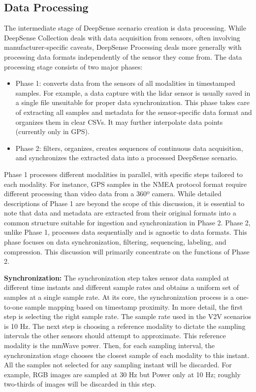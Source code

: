 \documentclass[10pt,comsoc]{IEEEtran}
\begin{document}
\subsection{Data Processing} \label{subsec:Processing}

The intermediate stage of DeepSense scenario creation is data processing. While DeepSense Collection deals with data acquisition from sensors, often involving manufacturer-specific caveats, DeepSense Processing deals more generally with processing data formats independently of the sensor they come from. The data processing stage consists of two major phases:
\begin{itemize}
    \item Phase 1: converts data from the sensors of all modalities in timestamped samples. For example, a data capture with the lidar sensor is usually saved in a single file unsuitable for proper data synchronization. This phase takes care of extracting all samples and metadata for the sensor-specific data format and organizes them in clear CSVs. It may further interpolate data points (currently only in GPS).
    \item Phase 2: filters, organizes, creates sequences of continuous data acquisition, and synchronizes the extracted data into a processed DeepSense scenario.
\end{itemize}
Phase 1 processes different modalities in parallel, with specific steps tailored to each modality. For instance, GPS samples in the NMEA protocol format require different processing than video data from a 360º camera. While detailed descriptions of Phase 1 are beyond the scope of this discussion, it is essential to note that data and metadata are extracted from their original formats into a common structure suitable for ingestion and synchronization in Phase 2. Phase 2, unlike Phase 1, processes data sequentially and is agnostic to data formats. This phase focuses on data synchronization, filtering, sequencing, labeling, and compression. This discussion will primarily concentrate on the functions of Phase 2.

\textbf{Synchronization:} The synchronization step takes sensor data sampled at different time instants and different sample rates and obtains a uniform set of samples at a single sample rate. At its core, the synchronization process is a one-to-one sample mapping based on timestamp proximity. In more detail, the first step is selecting the right sample rate. The sample rate used in the V2V scenarios is 10 Hz. The next step is choosing a reference modality to dictate the sampling intervals the other sensors should attempt to approximate. This reference modality is the mmWave power. Then, for each sampling interval, the synchronization stage chooses the closest sample of each modality to this instant. All the samples not selected for any sampling instant will be discarded. For example, RGB images are sampled at 30 Hz but Power only at 10 Hz; roughly two-thirds of images will be discarded in this step. 
\end{document}
